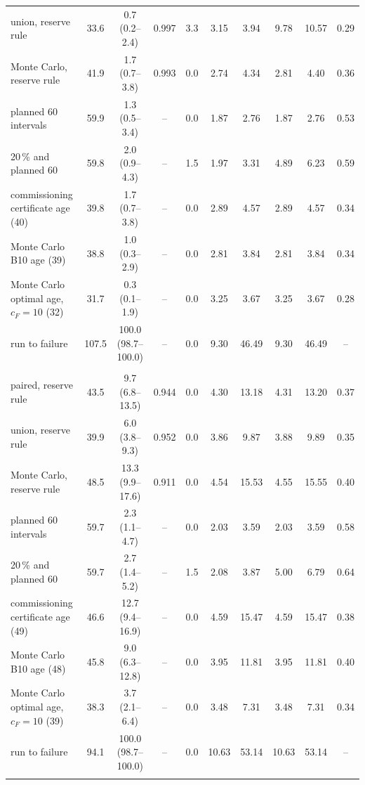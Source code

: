 \begin{table}[htbp]
\begin{tabular*}{\textwidth}{@{\extracolsep{\fill}}lccccccccc@{}}
union, reserve rule & 33.6 & 0.7 (0.2--2.4) & 0.997 & 3.3 & 3.15 & 3.94 & 9.78 & 10.57 & 0.29 \\
Monte Carlo, reserve rule & 41.9 & 1.7 (0.7--3.8) & 0.993 & 0.0 & 2.74 & 4.34 & 2.81 & 4.40 & 0.36 \\
planned 60 intervals & 59.9 & 1.3 (0.5--3.4) & -- & 0.0 & 1.87 & 2.76 & 1.87 & 2.76 & 0.53 \\
20\,\% and planned 60 & 59.8 & 2.0 (0.9--4.3) & -- & 1.5 & 1.97 & 3.31 & 4.89 & 6.23 & 0.59 \\
commissioning certificate age (40) & 39.8 & 1.7 (0.7--3.8) & -- & 0.0 & 2.89 & 4.57 & 2.89 & 4.57 & 0.34 \\
Monte Carlo B10 age (39) & 38.8 & 1.0 (0.3--2.9) & -- & 0.0 & 2.81 & 3.84 & 2.81 & 3.84 & 0.34 \\
Monte Carlo optimal age, $c_F=10$ (32) & 31.7 & 0.3 (0.1--1.9) & -- & 0.0 & 3.25 & 3.67 & 3.25 & 3.67 & 0.28 \\
run to failure & 107.5 & 100.0 (98.7--100.0) & -- & 0.0 & 9.30 & 46.49 & 9.30 & 46.49 & -- \\
\addlinespace
\multicolumn{10}{@{}l}{\textit{drift $\rho=0.4$, stated bound}} \\
paired, reserve rule & 43.5 & 9.7 (6.8--13.5) & 0.944 & 0.0 & 4.30 & 13.18 & 4.31 & 13.20 & 0.37 \\
union, reserve rule & 39.9 & 6.0 (3.8--9.3) & 0.952 & 0.0 & 3.86 & 9.87 & 3.88 & 9.89 & 0.35 \\
Monte Carlo, reserve rule & 48.5 & 13.3 (9.9--17.6) & 0.911 & 0.0 & 4.54 & 15.53 & 4.55 & 15.55 & 0.40 \\
planned 60 intervals & 59.7 & 2.3 (1.1--4.7) & -- & 0.0 & 2.03 & 3.59 & 2.03 & 3.59 & 0.58 \\
20\,\% and planned 60 & 59.7 & 2.7 (1.4--5.2) & -- & 1.5 & 2.08 & 3.87 & 5.00 & 6.79 & 0.64 \\
commissioning certificate age (49) & 46.6 & 12.7 (9.4--16.9) & -- & 0.0 & 4.59 & 15.47 & 4.59 & 15.47 & 0.38 \\
Monte Carlo B10 age (48) & 45.8 & 9.0 (6.3--12.8) & -- & 0.0 & 3.95 & 11.81 & 3.95 & 11.81 & 0.40 \\
Monte Carlo optimal age, $c_F=10$ (39) & 38.3 & 3.7 (2.1--6.4) & -- & 0.0 & 3.48 & 7.31 & 3.48 & 7.31 & 0.34 \\
run to failure & 94.1 & 100.0 (98.7--100.0) & -- & 0.0 & 10.63 & 53.14 & 10.63 & 53.14 & -- \\
\addlinespace
\multicolumn{10}{@{}l}{\textit{drift $\rho=0.4$, allowance 1.32}} \\

\end{tabular*}
\end{table}
